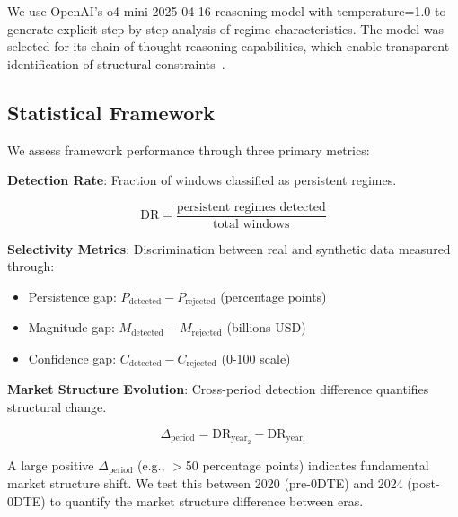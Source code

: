 We use OpenAI's o4-mini-2025-04-16 reasoning model with temperature=1.0 to generate explicit step-by-step analysis of regime characteristics. The model was selected for its chain-of-thought reasoning capabilities, which enable transparent identification of structural constraints~\citep{openai2024reasoning}.

\subsection{Statistical Framework}

We assess framework performance through three primary metrics:

\vspace{0.3cm}

\noindent\textbf{Detection Rate}: Fraction of windows classified as persistent regimes.

\begin{equation}
\text{DR} = \frac{\text{persistent regimes detected}}{\text{total windows}}
\end{equation}

\vspace{0.2cm}

\noindent\textbf{Selectivity Metrics}: Discrimination between real and synthetic data measured through:

\begin{itemize}
\item Persistence gap: $P_{\text{detected}} - P_{\text{rejected}}$ (percentage points)
\item Magnitude gap: $M_{\text{detected}} - M_{\text{rejected}}$ (billions USD)
\item Confidence gap: $C_{\text{detected}} - C_{\text{rejected}}$ (0-100 scale)
\end{itemize}

\vspace{0.2cm}

\noindent\textbf{Market Structure Evolution}: Cross-period detection difference quantifies structural change.

\begin{equation}
\Delta_{\text{period}} = \text{DR}_{\text{year}_2} - \text{DR}_{\text{year}_1}
\end{equation}

A large positive $\Delta_{\text{period}}$ (e.g., $>$50 percentage points) indicates fundamental market structure shift. We test this between 2020 (pre-0DTE) and 2024 (post-0DTE) to quantify the market structure difference between eras.
